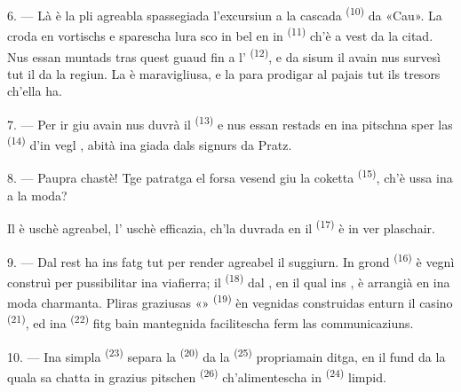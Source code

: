 \VUsaut{3.0mm}
\VUsaut{3.0mm}

6. --- Là è la pli agreabla spassegiada l'excursiun a la cascada \textsuperscript{(10)}
da «Cau». La  croda en vortischs e sparescha lura sco in bel
 en in  \textsuperscript{(11)} ch'è a vest da la
citad. Nus essan muntads tras quest guaud fin a l'
\textsuperscript{(12)}, e da sisum il  avain nus survesì tut il
 da la regiun. La  è maravigliusa, e la
 para prodigar al pajais tut ils tresors ch'ella ha.

7. --- Per ir giu avain nus duvrà il  \textsuperscript{(13)} e nus
essan restads en ina pitschna  sper las 
\textsuperscript{(14)} d'in vegl , abità ina giada dals signurs da
Pratz.

8. --- Paupra chastè! Tge patratga el forsa vesend giu la coketta  \textsuperscript{(15)}, ch'è ussa ina  a la moda?

Il  è uschè agreabel, l' uschè efficazia, ch'la
 duvrada en il  \textsuperscript{(17)} è in ver plaschair.

\VUsaut{3.0mm}
\VUsaut{3.0mm}

9. --- Dal rest ha ins fatg tut per render agreabel il suggiurn. In grond
 \textsuperscript{(16)} è vegnì construì per pussibilitar ina viafierra;
il  \textsuperscript{(18)} dal , en il qual ins
, è arrangià en ina moda charmanta. Pliras graziusas
«» \textsuperscript{(19)} èn vegnidas construidas enturn il casino
\textsuperscript{(21)}, ed ina  \textsuperscript{(22)} fitg bain
mantegnida facilitescha ferm las communicaziuns.

10. --- Ina simpla  \textsuperscript{(23)} separa la 
\textsuperscript{(20)} da la  \textsuperscript{(25)} propriamain ditga, en il
fund da la quala sa chatta in grazius pitschen  \textsuperscript{(26)}
ch'alimentescha
in  \textsuperscript{(24)} limpid.

